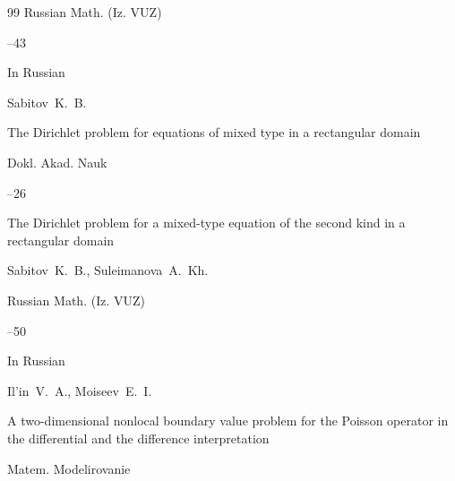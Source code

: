 \begin{thebibliography}{99}
\jour Russian Math. (Iz. VUZ)




--43






\lang In Russian

\by Sabitov~K.~B.

\paper The Dirichlet problem for equations of mixed type in a rectangular domain

\jour Dokl. Akad. Nauk 




--26






\paper The Dirichlet problem for a mixed-type equation of the second kind in a rectangular domain

\by Sabitov~K.~B., Suleimanova~A.~Kh.



\jour Russian Math. (Iz. VUZ)




--50







\lang In Russian

\by Il'in~V.~A., Moiseev~E.~I.

\paper A two-dimensional nonlocal boundary value problem for the Poisson operator in the differential and the difference interpretation

\jour Matem. Modelirovanie




\end{thebibliography}
